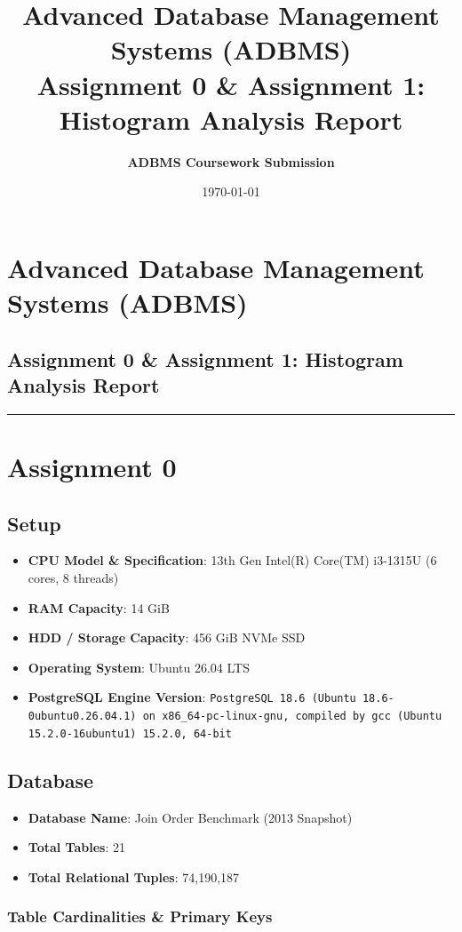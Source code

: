 \documentclass[11pt,a4paper]{article}
\title{\textbf{Advanced Database Management Systems (ADBMS)\\[0.5em] \Large Assignment 0 \& Assignment 1: Histogram Analysis Report}}
\author{\textbf{ADBMS Coursework Submission}}
\date{\today}
\begin{document}
\maketitle
\tableofcontents
\newpage
\section{Advanced Database Management Systems (ADBMS)}
\subsection{Assignment 0 \& Assignment 1: Histogram Analysis Report}

\hrule


\section{Assignment 0}

\subsection{Setup}
\begin{itemize}
\item \textbf{CPU Model \& Specification}: 13th Gen Intel(R) Core(TM) i3-1315U (6 cores, 8 threads)
\item \textbf{RAM Capacity}: 14 GiB
\item \textbf{HDD / Storage Capacity}: 456 GiB NVMe SSD
\item \textbf{Operating System}: Ubuntu 26.04 LTS
\item \textbf{PostgreSQL Engine Version}: \texttt{PostgreSQL 18.6 (Ubuntu 18.6-0ubuntu0.26.04.1) on x86\_64-pc-linux-gnu, compiled by gcc (Ubuntu 15.2.0-16ubuntu1) 15.2.0, 64-bit}
\end{itemize}

\subsection{Database}
\begin{itemize}
\item \textbf{Database Name}: Join Order Benchmark (2013 Snapshot)
\item \textbf{Total Tables}: 21
\item \textbf{Total Relational Tuples}: 74,190,187
\end{itemize}

\subsubsection{Table Cardinalities \& Primary Keys}
\end{document}
